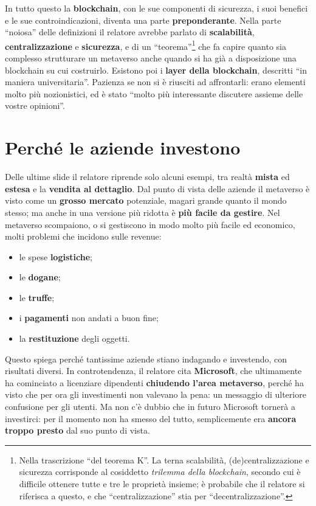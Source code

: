 In tutto questo la \textbf{blockchain}, con le sue componenti di sicurezza, i
suoi benefici e le sue controindicazioni, diventa una parte
\textbf{preponderante}. Nella parte ``noiosa'' delle definizioni il relatore
avrebbe parlato di \textbf{scalabilità}, \textbf{centralizzazione} e
\textbf{sicurezza}, e di un ``teorema''\footnote{Nella trascrizione ``del teorema
K''. La terna scalabilità, (de)centralizzazione e sicurezza corrisponde al
cosiddetto \emph{trilemma della blockchain}, secondo cui è difficile ottenere
tutte e tre le proprietà insieme; è probabile che il relatore si riferisca a
questo, e che ``centralizzazione'' stia per ``decentralizzazione''.} che fa
capire quanto sia complesso strutturare un metaverso anche quando si ha già a
disposizione una blockchain su cui costruirlo. Esistono poi i \textbf{layer della
blockchain}, descritti ``in maniera universitaria''. Pazienza se non si è
riusciti ad affrontarli: erano elementi molto più nozionistici, ed è stato
``molto più interessante discutere assieme delle vostre opinioni''.

\section{Perché le aziende investono}
\label{z8:sec:aziende}

Delle ultime slide il relatore riprende solo alcuni esempi, tra realtà
\textbf{mista} ed \textbf{estesa} e la \textbf{vendita al dettaglio}. Dal punto di
vista delle aziende il metaverso è visto come un \textbf{grosso mercato}
potenziale, magari grande quanto il mondo stesso; ma anche in una versione più
ridotta è \textbf{più facile da gestire}. Nel metaverso scompaiono, o si
gestiscono in modo molto più facile ed economico, molti problemi che incidono
sulle revenue:
\begin{itemize}
  \item le spese \textbf{logistiche};
  \item le \textbf{dogane};
  \item le \textbf{truffe};
  \item i \textbf{pagamenti} non andati a buon fine;
  \item la \textbf{restituzione} degli oggetti.
\end{itemize}
Questo spiega perché tantissime aziende stiano indagando e investendo, con
risultati diversi. In controtendenza, il relatore cita
\textbf{Microsoft}, che ultimamente ha cominciato a licenziare dipendenti
\textbf{chiudendo l'area metaverso}, perché ha visto che per ora gli
investimenti non valevano la pena: un messaggio di ulteriore confusione per gli
utenti. Ma non c'è dubbio che in futuro Microsoft tornerà a investirci: per il
momento non ha smesso del tutto, semplicemente era \textbf{ancora troppo presto}
dal suo punto di vista.

